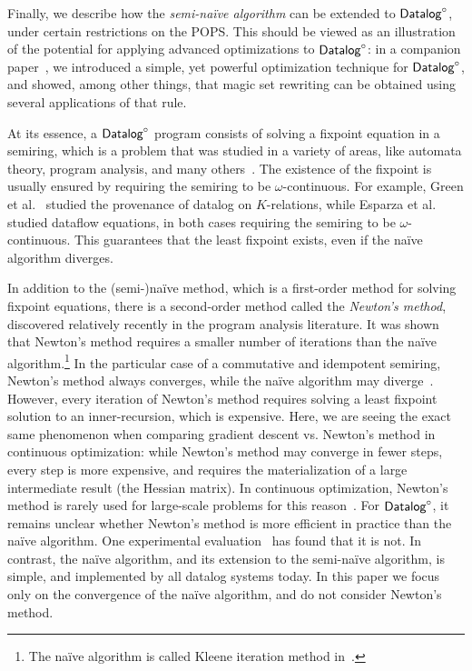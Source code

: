 Finally, we describe how the {\em semi-na\"ive algorithm} can be
extended to $\text{\sf Datalog}^\circ$, under certain restrictions on the POPS.  This
should be viewed as an illustration of the potential for applying
advanced optimizations to $\text{\sf Datalog}^\circ$: in a companion
paper~\cite{DBLP:conf/sigmod/WangK0PS22}, we introduced a simple, yet
powerful optimization technique for $\text{\sf Datalog}^\circ$, and showed, among other
things, that magic set rewriting can be obtained using several
applications of that rule.

At its essence, a $\text{\sf Datalog}^\circ$ program consists of solving a fixpoint
equation in a semiring, which is a problem that was studied in a variety
of areas, like automata theory, program analysis, and many
others~\cite{MR1470001,DBLP:conf/popl/CousotC77,MR1728440,MR1059930,
  DBLP:conf/lics/HopkinsK99, DBLP:journals/tcs/Lehmann77,
  semiring_book,MR609751}.  The existence of the fixpoint is usually
ensured by requiring the semiring to be $\omega$-continuous. For
example, Green et al.~\cite{DBLP:conf/pods/GreenKT07} studied the
provenance of datalog on $K$-relations, while Esparza et
al.~\cite{DBLP:journals/jacm/EsparzaKL10} studied dataflow equations,
in both cases requiring the semiring to be $\omega$-continuous.  This
guarantees that the least fixpoint exists, even if the na\"ive algorithm
diverges.

In addition to the (semi-)na\"ive method, which is a first-order method for solving
fixpoint equations, there is a second-order method called the {\em Newton's method},
discovered relatively recently \cite{DBLP:journals/jacm/EsparzaKL10,DBLP:conf/lics/HopkinsK99}
in the program analysis literature.
It was shown that Newton's method requires a smaller number of iterations than the
na\"ive algorithm.\footnote{The na\"ive algorithm is called Kleene iteration
method in~\cite{DBLP:journals/jacm/EsparzaKL10}.} In the particular
case of a commutative and idempotent semiring, Newton's method always converges, while the
na\"ive algorithm may diverge~\cite{DBLP:journals/jacm/EsparzaKL10}.
However, every iteration of Newton's method requires solving a least fixpoint solution
to an inner-recursion, which is expensive.
Here, we are seeing the exact same phenomenon when comparing gradient descent vs.
Newton's method in continuous optimization: while Newton's method may converge in fewer
steps, every step is more expensive, and requires the materialization of a large intermediate
result (the Hessian matrix).
In continuous optimization, Newton's method is rarely used for large-scale problems for
this reason~\cite{DBLP:books/sp/NocedalW99}.
For $\text{\sf Datalog}^\circ$, it remains unclear whether Newton's method is more efficient in practice than
the na\"ive algorithm.  One experimental evaluation~\cite{DBLP:conf/popl/RepsTP16} has
found that it is not. In contrast, the na\"ive algorithm, and its
extension to the semi-na\"ive algorithm, is simple, and implemented by
all datalog systems today.  In this paper we focus only on the
convergence of the na\"ive algorithm, and do not consider Newton's
method.


